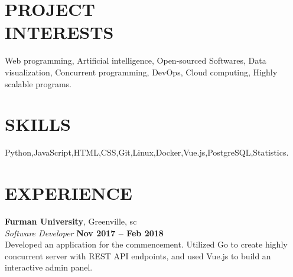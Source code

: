 \documentclass[margin,line]{resume}
\begin{document}
\begin{resume}

\vspace{1mm}

    \section{\mysidestyle \textbf{\large{P}\small{ROJECT\\INTERESTS}}}

    	Web programming, Artificial intelligence, Open-sourced Softwares, Data visualization, Concurrent programming, DevOps, Cloud computing, Highly scalable programs.

\sectionline

    \section{\mysidestyle \textbf{\large{S}\small{KILLS}}}

    Python,\hspace{2mm}JavaScript,\hspace{2mm}HTML,\hspace{2mm}CSS,\hspace{2mm}Git,\hspace{2mm}Linux,\hspace{2mm}Docker,\hspace{2mm}Vue.js,\hspace{2mm}PostgreSQL,\hspace{2mm}Statistics.
    


\sectionline

    \section{\mysidestyle \textbf{\large{E}\small{XPERIENCE}}}

    \textbf{\listing Furman University}, Greenville, sc \vspace{2mm}\\\vspace{1mm}%
    \textsl{Software Developer} \hfill \textbf{Nov 2017 -- Feb 2018}\\
    Developed an application for the commencement. Utilized Go to create highly concurrent server with REST API endpoints, and used Vue.js to build an interactive admin panel. \vspace{1mm}


\end{resume}
\end{document}
